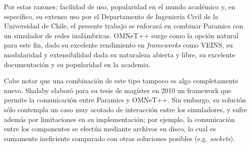 Por estas razones; facilidad de uso, popularidad en el mundo académico y, en específico, su extenso uso por el Departamento de Ingeniería Civil de la Universidad de Chile, el presente trabajo se enfocará en combinar Paramics con un simulador de redes inalámbricas. OMNeT++ surge como la opción natural para este fin, dado su excelente rendimiento en \textit{frameworks} como VEINS, su modularidad y extensibilidad dada su naturaleza abierta y libre, su excelente documentación y su popularidad en la academia.

Cabe notar que una combinación de este tipo tampoco es algo completamente nuevo. Shalaby elaboró para su tesis de magíster en 2010 \cite{shalaby} un framework que permite la comunicación entre Paramics y OMNeT++. Sin embargo, su solución sólo contempla un caso muy acotado de interacción entre los simuladores, y sufre además por limitaciones en su implementación; por ejemplo, la comunicación entre los componentes se efectúa mediante archivos en disco, lo cual es sumamente ineficiente comparado con otras soluciones posibles (e.g. \textit{sockets}).
